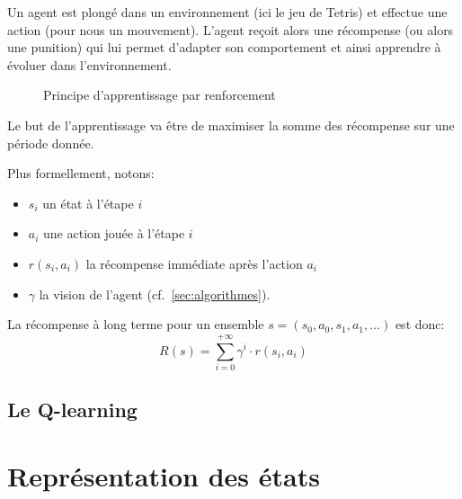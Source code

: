 \documentclass{report}
\begin{document}
Un agent est plongé dans un environnement (ici le jeu de Tetris) et effectue une
action (pour nous un mouvement). L'agent reçoit alors une récompense (ou alors
une punition) qui lui permet d'adapter son comportement et ainsi apprendre à
évoluer dans l'environnement.

\begin{figure}[h]
    \begin{center}
    \end{center}

    \caption{Principe d'apprentissage par renforcement}
    \label{}
\end{figure}

Le but de l'apprentissage va être de maximiser la somme des récompense sur une
période donnée.

Plus formellement, notons:
\begin{itemize}
    \item \( s_i \) un état à l'étape \( i \)
    \item \( a_i \) une action jouée à l'étape \( i \)
    \item \( r(s_i, a_i) \) la récompense immédiate après l'action \( a_i \)
    \item \( \gamma \) la vision de l'agent (cf.~\ref{sec:algorithmes}).
\end{itemize}

La récompense à long terme pour un ensemble
\( s = (s_0, a_0, s_1, a_1, \hdots) \) est donc:
\[
  R(s) = \sum_{i=0}^{+\infty}\gamma^i \cdot r(s_i, a_i)
\]


\subsection{Le Q-learning}



\section{Représentation des états}
\end{document}
